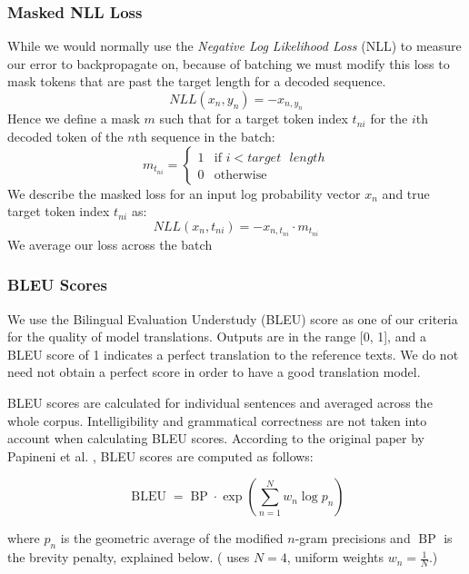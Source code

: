 \documentclass[twoside,twocolumn]{article}
\begin{document}
\subsubsection{Masked NLL Loss}
\label{sec:masked-loss}
While we would normally use the \emph{Negative Log Likelihood Loss} (NLL) to
measure our error to backpropagate on, because of batching we must modify this
loss to mask tokens that are past the target length for a decoded sequence.
\begin{equation}
  NLL(x_n, y_n) = -x_{n, y_n}
\end{equation}
Hence we define a mask $m$ such that for a target token index $t_{ni}$ for the
$i$th decoded token of the $n$th sequence in the batch:
\begin{equation}
  m_{t_{ni}} = \begin{cases}
    1 & \text{if } i < target \text{ } length \\
    0 & \text{otherwise}
  \end{cases}
\end{equation}
We describe the masked loss for an input log probability vector $x_n$ and true
target token index $t_{ni}$ as:
\begin{equation}
  NLL(x_n, t_{ni}) = -x_{n, t_{ni}} \cdot m_{t_{ni}}
\end{equation}
We average our loss across the batch
\subsubsection{BLEU Scores}
\label{sec:bleu}
We use the Bilingual Evaluation Understudy (BLEU) score as one of our criteria
for the quality of model translations. Outputs are in the range [0, 1], and a
BLEU score of 1 indicates a perfect translation to the reference texts.
We do not need not obtain a perfect score in order to have a good
translation model.

BLEU scores are calculated for individual sentences and averaged across the
whole corpus. Intelligibility and grammatical correctness are not taken into
account when calculating BLEU scores. According to the original paper by
Papineni et al. \cite{papineni2002bleu}, BLEU scores are computed as follows:

\begin{equation}
  \operatorname{BLEU} = \operatorname{BP} \cdot \exp \left( \sum_{n=1}^N w_n \log p_n \right)
\end{equation}

\noindent
where $p_n$ is the geometric average of the modified $n$-gram precisions
and $\operatorname{BP}$ is the brevity penalty, explained below.
(\cite{papineni2002bleu} uses $N=4$, uniform weights $w_n = \frac{1}{N}$.)
\end{document}
